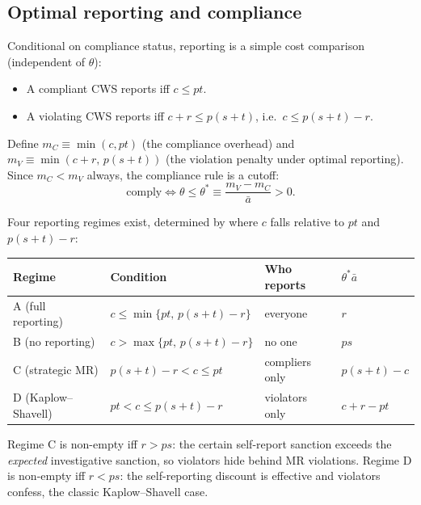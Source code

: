 \documentclass{article}
\begin{document}
\subsection{Optimal reporting and compliance}

Conditional on compliance status, reporting is a simple cost comparison (independent of $\theta$):
\begin{itemize}
\item A compliant CWS reports iff $c \le pt$.
\item A violating CWS reports iff $c + r \le p(s+t)$, i.e.\ $c \le p(s+t) - r$.
\end{itemize}
Define $m_C \equiv \min(c, pt)$ (the compliance overhead) and $m_V \equiv \min(c+r,\, p(s+t))$ (the violation penalty under optimal reporting). Since $m_C < m_V$ always, the compliance rule is a cutoff:
\begin{equation}\label{eq:cutoff}
\text{comply} \iff \theta \le \theta^* \equiv \frac{m_V - m_C}{\bar{a}} > 0.
\end{equation}

Four reporting regimes exist, determined by where $c$ falls relative to $pt$ and $p(s+t)-r$:
\begin{center}
\begin{tabular}{llll}
Regime & Condition & Who reports & $\theta^*\bar{a}$ \\
\hline
A (full reporting) & $c \le \min\{pt,\, p(s+t)-r\}$ & everyone & $r$ \\
B (no reporting) & $c > \max\{pt,\, p(s+t)-r\}$ & no one & $ps$ \\
C (strategic MR) & $p(s+t)-r < c \le pt$ & compliers only & $p(s+t) - c$ \\
D (Kaplow--Shavell) & $pt < c \le p(s+t)-r$ & violators only & $c + r - pt$ \\
\end{tabular}
\end{center}
Regime C is non-empty iff $r > ps$: the certain self-report sanction exceeds the \emph{expected} investigative sanction, so violators hide behind MR violations. Regime D is non-empty iff $r < ps$: the self-reporting discount is effective and violators confess, the classic Kaplow--Shavell case.
\end{document}
